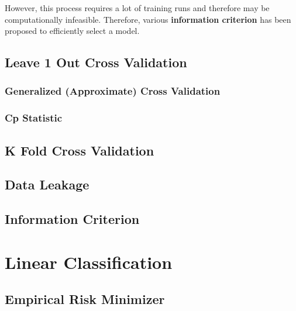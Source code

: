 \documentclass{article}
\begin{document}
    However, this process requires a lot of training runs and therefore may be computationally infeasible. Therefore, various \textbf{information criterion} has been proposed to efficiently select a model. 

  \subsection{Leave 1 Out Cross Validation} 

    \subsubsection{Generalized (Approximate) Cross Validation} 

    \subsubsection{Cp Statistic}

  \subsection{K Fold Cross Validation}

  \subsection{Data Leakage}

  \subsection{Information Criterion}

\section{Linear Classification}

  \subsection{Empirical Risk Minimizer} 
\end{document}
